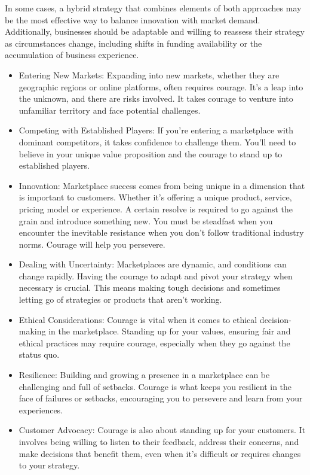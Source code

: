 \documentclass[
]{book}
\begin{document}
In some cases, a hybrid strategy that combines elements of both approaches may be the most effective way to balance innovation with market demand. Additionally, businesses should be adaptable and willing to reassess their strategy as circumstances change, including shifts in funding availability or the accumulation of business experience.

\begin{itemize}
\item
  Entering New Markets: Expanding into new markets, whether they are geographic regions or online platforms, often requires courage. It's a leap into the unknown, and there are risks involved. It takes courage to venture into unfamiliar territory and face potential challenges.
\item
  Competing with Established Players: If you're entering a marketplace with dominant competitors, it takes confidence to challenge them. You'll need to believe in your unique value proposition and the courage to stand up to established players.
\item
  Innovation: Marketplace success comes from being unique in a dimension that is important to customers. Whether it's offering a unique product, service, pricing model or experience. A certain resolve is required to go against the grain and introduce something new. You must be steadfast when you encounter the inevitable resistance when you don't follow traditional industry norms. Courage will help you persevere.
\item
  Dealing with Uncertainty: Marketplaces are dynamic, and conditions can change rapidly. Having the courage to adapt and pivot your strategy when necessary is crucial. This means making tough decisions and sometimes letting go of strategies or products that aren't working.
\item
  Ethical Considerations: Courage is vital when it comes to ethical decision-making in the marketplace. Standing up for your values, ensuring fair and ethical practices may require courage, especially when they go against the status quo.
\item
  Resilience: Building and growing a presence in a marketplace can be challenging and full of setbacks. Courage is what keeps you resilient in the face of failures or setbacks, encouraging you to persevere and learn from your experiences.
\item
  Customer Advocacy: Courage is also about standing up for your customers. It involves being willing to listen to their feedback, address their concerns, and make decisions that benefit them, even when it's difficult or requires changes to your strategy.
\end{itemize}
\end{document}
